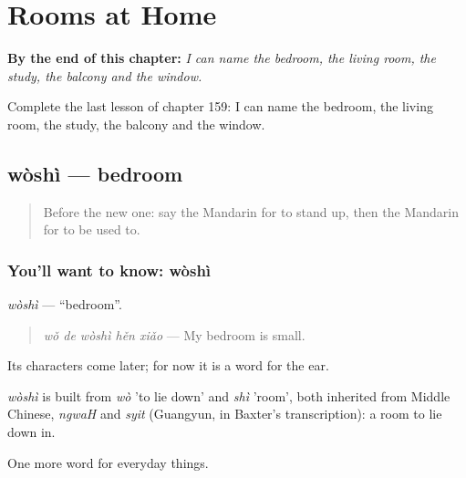 
\chapter{Rooms at Home}
\label{ch:zh-rooms-at-home}

\begin{chapteropening}
\textbf{By the end of this chapter:} \emph{I can name the bedroom, the living room, the study, the balcony and the window.}

Complete the last lesson of chapter 159: I can name the bedroom, the living room, the study, the balcony and the window.
\end{chapteropening}

\section[wòshì]{wòshì — bedroom}

\label{lesson:ZH-C159-woshi}



\begin{quote}
Before the new one: say the Mandarin for to stand up, then the Mandarin for to be used to.
\end{quote}

\subsection*{You'll want to know: wòshì}
\emph{wòshì} — \textquotedblleft{}bedroom\textquotedblright{}.

\begin{quote}
\emph{wǒ de wòshì hěn xiǎo} — My bedroom is small.
\end{quote}

Its characters come later; for now it is a word for the ear.

\begin{cousinweb}
\emph{wòshì} is built from \emph{wò} 'to lie down' and \emph{shì} 'room', both inherited from Middle Chinese, \emph{ngwaH} and \emph{syit} (Guangyun, in Baxter's transcription): a room to lie down in.
\end{cousinweb}

\begin{grammarlens}[title={What you've built}]
One more word for everyday things.
\end{grammarlens}

